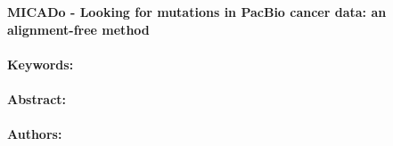\noindent
\large {\bf MICADo - Looking for mutations in PacBio cancer data: an alignment-free method} 


\normalsize 


\noindent \paragraph{Keywords:} 

\noindent \paragraph{Abstract:} 



\noindent \paragraph{Authors:} 

